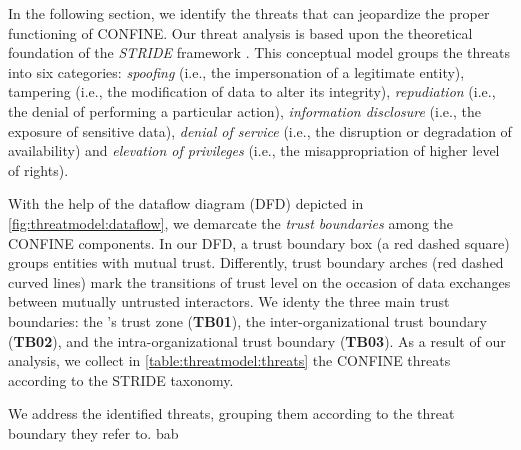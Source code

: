 \begin{newj}
	

In the following section, we identify the threats that can jeopardize the proper functioning of CONFINE. Our threat analysis is based upon the theoretical foundation of the \textit{STRIDE} framework \cite{DBLP:journals/re/ScandariatoWJ15}. This conceptual model groups the threats into six categories: \textit{spoofing} (i.e., the impersonation of a legitimate entity), tampering (i.e., the modification of data to alter its integrity), \textit{repudiation} (i.e., the denial of performing a particular action), \textit{information disclosure} (i.e., the exposure of sensitive data), \textit{denial of service} (i.e., the disruption or degradation of availability) and \textit{elevation of privileges} (i.e., the misappropriation of higher level of rights). 

With the help of the dataflow diagram (DFD) depicted in \cref{fig:threatmodel:dataflow}, we demarcate the \textit{trust boundaries} among the CONFINE components. In our DFD, a trust boundary box (a red dashed square) groups entities with mutual trust. Differently, trust boundary arches (red dashed curved lines) mark the transitions of trust level on the occasion of data exchanges between mutually untrusted interactors. We identy the three main trust boundaries: the 's trust zone (\textbf{TB01}), the inter-organizational trust boundary (\textbf{TB02}), and the intra-organizational trust boundary (\textbf{TB03}). As a result of our analysis, we collect in \cref{table:threatmodel:threats} the CONFINE threats according to the STRIDE taxonomy.

We address the identified threats, grouping them according to the threat boundary they refer to.  
	bab


\end{newj}
